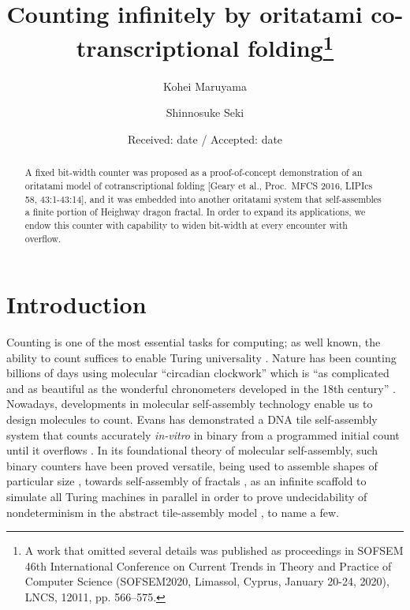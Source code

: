 \documentclass[twocolumn]{svjour3}
\begin{document}
\title{Counting infinitely by oritatami co-transcriptional folding\thanks{A work that omitted several details was published as proceedings in SOFSEM 46th International Conference on Current Trends in Theory and Practice of Computer Science (SOFSEM2020, Limassol, Cyprus, January 20-24, 2020), LNCS, 12011, pp. 566--575.}}

\author{
Kohei Maruyama\and
Shinnosuke Seki
}

\date{Received: date / Accepted: date}

\maketitle


\begin{abstract}
A fixed bit-width counter was proposed as a proof-of-concept demonstration of an oritatami model of cotranscriptional folding [Geary et al., Proc.~MFCS 2016, LIPIcs 58, 43:1-43:14], and it was embedded into another oritatami system that self-assembles a finite portion of Heighway dragon fractal. 
In order to expand its applications, we endow this counter with capability to widen bit-width at every encounter with overflow. 
\end{abstract}

	\section{Introduction}

Counting is one of the most essential tasks for computing; as well known, the ability to count suffices to enable Turing universality \cite{Minsky1967}. 
Nature has been counting billions of days using molecular ``circadian clockwork'' which is ``as complicated and as beautiful as the wonderful chronometers developed in the 18th century''  \cite{McClung2006}. 
Nowadays, developments in molecular self-assembly technology enable us to design molecules to count. 
Evans has demonstrated a DNA tile self-assembly system that counts accurately \textit{in-vitro} in binary from a programmed initial count until it overflows \cite{EvansPhD}. 
In its foundational theory of molecular self-assembly, such binary counters have been proved versatile, being used to assemble shapes of particular size \cite{AdChGoHu2001,RothemundWinfree2000}, towards self-assembly of fractals \cite{MasudaSekiUbukata2018}, as an infinite scaffold to simulate all Turing machines in parallel in order to prove undecidability of nondeterminism in the abstract tile-assembly model \cite{BrChDoKaSe2013}, to name a few. 
\end{document}
